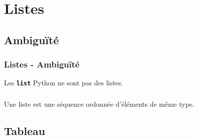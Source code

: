 \documentclass[svgnames,11pt]{beamer}
\begin{document}
\section{Listes}
\subsection{Ambiguïté}
\begin{frame}
    \frametitle{Listes - Ambiguïté}


    \begin{aretenir}[Observation]
        \centering Les \textbf{\texttt{list}} Python ne sont pas des listes.
    \end{aretenir}
\end{frame}
\begin{frame}
    \frametitle{}

    \begin{aretenir}[Définition]
        \centering Une liste est une séquence ordonnée d'éléments de même type.
    \end{aretenir}

\end{frame}
\subsection{Tableau}
\end{document}
